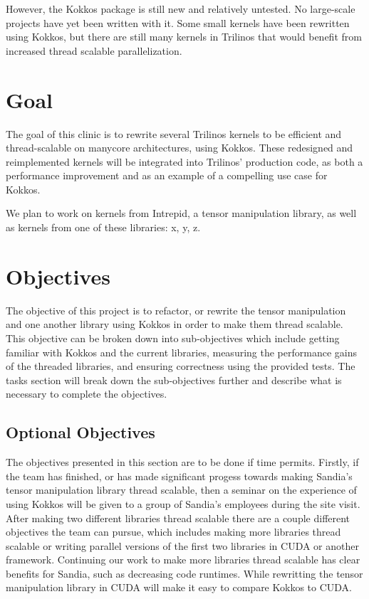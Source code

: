 \documentclass[proposal]{hmcclinic}
\begin{document}
However, the Kokkos package is still new and relatively untested.  No
large-scale projects have yet been written with it.  Some small kernels
have been rewritten using Kokkos, but there are still many kernels in Trilinos
that would benefit from increased thread scalable parallelization.


\section{Goal}

The goal of this clinic is to rewrite several Trilinos kernels to be efficient
and thread-scalable on manycore architectures, using Kokkos.  These redesigned
and reimplemented kernels will be integrated into Trilinos' production code, as
both a performance improvement and as an example of a compelling use case for
Kokkos.

We plan to work on kernels from Intrepid, a tensor manipulation library, as well
as kernels from one of these libraries: x, y, z.

\section{Objectives}

The objective of this project is to refactor, or rewrite the tensor manipulation 
and one another library using Kokkos in order to make them thread scalable. This
objective can be broken down into sub-objectives which include getting familiar
with Kokkos and the current libraries, measuring the performance gains of the 
threaded libraries, and ensuring correctness using the provided tests. The tasks
section will break down the sub-objectives further and describe what is necessary
to complete the objectives.

\subsection{Optional Objectives}



The objectives presented in this section are to be done if time
permits. Firstly, if the team has finished, or has made significant progess
towards making Sandia's tensor manipulation library thread scalable, then a
seminar on the experience of using Kokkos will be given to a group of Sandia's 
employees during the site visit. After making two different libraries thread
scalable there are a couple different objectives the team can pursue, which
includes making more libraries thread scalable or writing parallel versions of 
the first two libraries in CUDA or another framework. Continuing our work to
make more libraries thread scalable has clear benefits for Sandia, such as 
decreasing code runtimes. While rewritting the tensor manipulation library
in CUDA will make it easy to compare Kokkos to CUDA.
\end{document}
